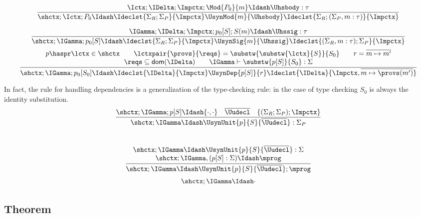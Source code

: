 \[
\frac{
\Ictx; \IDelta; \Impctx; \Mod{P_0}{m} \Idash \Uhsbody : \tau
}{
\shctx; \Ictx; P_0 \Idash \Ideclst{\Sigma_R; \Sigma_P}{\Impctx} \UsynMod{m}{\Uhsbody} \Ideclst{\Sigma_R; (\Sigma_P, m : \tau)}{\Impctx}
}
\]
\begin{greybox}
\[%
\frac{
\IGamma; \IDelta; \Impctx; p_0[S]; S(m) \Idash \Uhssig : \tau
}{
\shctx; \IGamma; p_0[S] \Idash \Ideclst{\Sigma_R; \Sigma_P}{\Impctx} \UsynSig{m}{\Uhssig} \Ideclst{(\Sigma_R, m : \tau); \Sigma_P}{\Impctx}
}
\]
\[
\frac{
\begin{array}{c}
p \haspr \lctx \in \shctx \qquad
\lctxpair{\provs}{\reqs} = \substw{\substw{\lctx}{S}}{S_0} \qquad
r = \overline{m \mapsto m'} \\
\reqs \subseteq \textsf{dom}(\IDelta) \qquad
\IGamma \vdash \substw{p[S]}{S_0} : \Sigma
\end{array}
}{
\shctx; \IGamma; p_0[S_0] \Idash \Ideclst{\IDelta}{\Impctx} \UsynDep{p[S]}{r} \Ideclst{\IDelta}{\Impctx,  \overline{m \mapsto \provs(m')}}
}
\]
\end{greybox}

In fact, the rule for handling dependencies is a generalization
of the type-checking rule: in the case of type checking $S_0$ is
always the identity substitution.\\

\fbox{$\shctx; \IGamma \Idash \Uunit : \Sigma$}
\[
\frac{
\shctx; \IGamma; p[S] \Idash \{ \cdot, \cdot \} \quad \overline{\Uudecl} \quad \{ (\Sigma_R; \Sigma_P) ; \Impctx \}
}{
\begin{array}{l}
\shctx; \IGamma \Idash \UsynUnit{p}{S}{\overline{\Uudecl}} : \Sigma_P
\end{array}
}
\]\\

\fbox{$\shctx; \IGamma \Idash \mprog$}
\[
\frac{
\begin{array}{c}
\shctx; \IGamma \Idash \UsynUnit{p}{S}{\overline{\Uudecl}} : \Sigma \\
\shctx; \IGamma, (p[S] : \Sigma) \Idash \mprog \\
\end{array}
}{
\shctx; \IGamma \Idash \UsynUnit{p}{S}{\overline{\Uudecl}}; \mprog
}
\]
\[
\shctx; \IGamma \Idash \cdot
\]

\subsection{Theorem}


